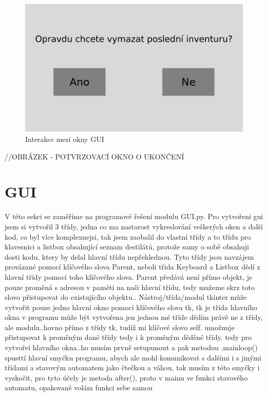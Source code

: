 \begin{figure}[H]
    \begin{center}
        \includegraphics[scale=0.4]{obrazky/GUI Vymazání inventury.png}
    \end{center}
    \caption{Interakce mezi okny GUI}
    \label{Interakce mezi okny GUI}
\end{figure}
//OBRÁZEK - POTVRZOVACÍ OKNO O UKONČENÍ

\section{GUI}
V této sekci se zaměříme na programové řešení modulu GUI.py. Pro vytvoření gui jsem si vytvořil 3 třídy, jedna co ma nastarost vykreslování veškerých oken a další kod, co byl více komplexnejsi, tak jsem zaobalil do vlastní třídy a to třídu pro klavesnici a listbox obsahující seznam destilátů, protože samy o sobě obsahuji dosti kodu, ktery by delal hlavní třídu nepřehlednou. Tyto třídy jsou navzájem provázané pomocí klíčového slova Parent, neboli třida Keyboard a Listbox dědí z hlavní třídy pomocí toho klíčového slova. Parent předává není přímo objekt, je pouze proměná s adresou v paměti na naši hlavní třídu, tedy mužeme skrz toto slovo přistupovat do existujícího objektu.. Nástroj/třída/modul tkinter může vytvořit pouze jedno hlavní okno pomocí klíčového slova tk, tk je třída hlavního okna v programu může být vytvořena jen jednou mé tříde dědím právě ne z třídy, ale modulu..hovno přímo z třídy tk, tudíž mi klíčové slovo self. umožnuje přistupovat k proměným dané třídy tedy i k proměným děděné třídy. tedy pro vytvořeí hlavního okna..ho musím prvně setupunout a pak metodou .mainloop() spusttí hlavní smyčku programu, abych ale mohl komunikovat s dalšími i s jinými třídami a stavovým automatem jako čtečkou a váhou, tak musím z této smyčky i vyskočit, pro tyto účely je metoda after(), proto v mainu ve funkci stavového automatu, opakovaně volám funkci sebe samou

